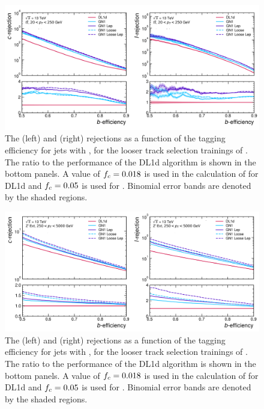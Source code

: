 \begin{figure}[!p]
    \centering
    \includegraphics[width=\textwidth]{chapters/gnn_tagger/figs/gn1_loose_ttbar.pdf}
    \caption{
        The \cjet (left) and \ljet (right) rejections as a function of the \bjet tagging efficiency for \ttbar jets with \ttbarpt, for the looser track selection trainings of \GNN.
        The ratio to the performance of the DL1d algorithm is shown in the bottom panels.
        A value of $f_c = 0.018$ is used in the calculation of \Db for DL1d and $f_c = 0.05$ is used for \GNN.
        Binomial error bands are denoted by the shaded regions.
    }
    \label{fig:ttbar_gn1_loose}
\end{figure}

\begin{figure}[!p]
    \centering
    \includegraphics[width=\textwidth]{chapters/gnn_tagger/figs/gn1_loose_zprime.pdf}
    \caption{
        The \cjet (left) and \ljet (right) rejections as a function of the \bjet tagging efficiency for \Zprime jets with \Zprimept, for the looser track selection trainings of \GNN.
        The ratio to the performance of the DL1d algorithm is shown in the bottom panels.
        A value of $f_c = 0.018$ is used in the calculation of \Db for DL1d and $f_c = 0.05$ is used for \GNN.
        Binomial error bands are denoted by the shaded regions.
    }
    \label{fig:zprime_gn1_loose}
\end{figure}


